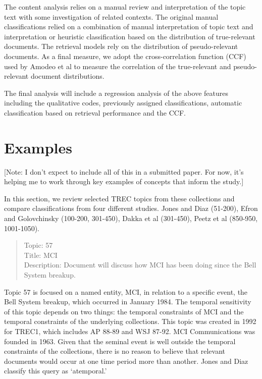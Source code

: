 \documentclass{sig-alternate}
\begin{document}
The content analysis relies on a manual review and interpretation of the topic text with some investigation of related contexts. The original manual classifications relied on a combination of manual interpretation of topic text and interpretation or heuristic classification based on the distribution of true-relevant documents. The retrieval models rely on the distribution of pseudo-relevant documents.  As a final measure, we adopt the cross-correlation function (CCF) used by Amodeo et al \cite{Amodeo2011} to measure the correlation of the true-relevant and pseudo-relevant document distributions. 

The final analysis will include a regression analysis of the above features including the qualitative codes, previously assigned classifications, automatic classification based on retrieval performance and the CCF.

\section{Examples}

[Note: I don't expect to include all of this in a submitted paper.  For now, it's helping me to work through key examples of concepts that inform the study.]

In this section, we review selected TREC topics from these collections and compare classifications from four different studies.  Jones and Diaz (51-200), Efron and Golovchinsky (100-200, 301-450), Dakka et al (301-450), Peetz et al (850-950, 1001-1050).

\begin{quote}
Topic: 57\\
Title: MCI\\
Description: Document will discuss how MCI has been doing since the Bell System breakup.
\end{quote}

Topic 57 is focused on a named entity, MCI, in relation to a specific event, the Bell System breakup, which occurred in January 1984. The temporal sensitivity of this topic depends on two things: the temporal constraints of MCI and the temporal constraints of the underlying collections. This topic was created in 1992 for TREC1, which includes AP 88-89 and WSJ 87-92. MCI Communications was founded in 1963. Given that the seminal event is well outside the temporal constraints of the collections, there is no reason to believe that relevant documents would occur at one time period more than another.  Jones and Diaz classify this query as `atemporal.'
\end{document}
